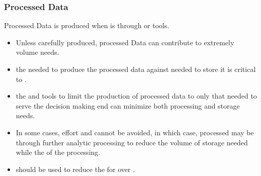 \documentclass[letterpaper,12pt,english]{book}
\begin{document}
\subsubsection{Processed Data}
\label{\detokenize{requirements/data/processed:processed-data}}\label{\detokenize{requirements/data/processed::doc}}
\sphinxAtStartPar
Processed Data is produced when  is  through
 or  tools.
\begin{itemize}
\item {} 
\sphinxAtStartPar
Unless carefully produced, processed Data can contribute to extremely  volume needs.

\item {} 
\sphinxAtStartPar
{} the  needed to produce the processed data against  needed to store it is critical to .

\item {} 
\sphinxAtStartPar
{} the  and  tools to limit the production of processed data to only that needed to serve the decision making end can minimize both processing and storage needs.

\item {} 
\sphinxAtStartPar
In some cases,  effort and  cannot be avoided, in which case, processed may be  through further analytic processing to reduce the volume of storage needed while  the  of the processing.

\item {} 
\sphinxAtStartPar
{} should be used to reduce the  for  over .

\end{itemize}
\end{document}

